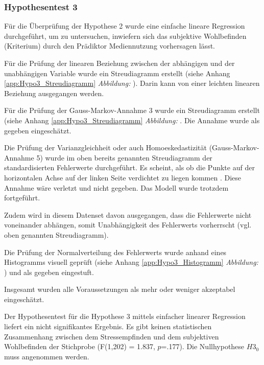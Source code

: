 \subsubsection{Hypothesentest 3}
Für die Überprüfung der Hypothese 2 wurde eine einfache lineare Regression durchgeführt, um zu untersuchen, inwiefern sich das subjektive Wohlbefinden (Kriterium) durch den Prädiktor Mediennutzung vorhersagen lässt.


Für die Prüfung der linearen Beziehung zwischen der abhängigen und der unabhängigen Variable wurde ein Streudiagramm erstellt (siehe Anhang \ref{app:Hypo3_Streudiagramm}  \textit{Abbildung: }). Darin kann von einer leichten linearen Beziehung ausgegangen werden.

Für die Prüfung der Gauss-Markov-Annahme 3 \cite{UniversitatZurich2018} wurde ein Streudiagramm erstellt (siehe Anhang \ref{app:Hypo3_Streudiagramm} \textit{Abbildung: }. Die Annahme wurde als gegeben eingeschätzt. 

Die Prüfung der Varianzgleichheit oder auch Homoeskedastizität (Gauss-Markov-Annahme 5) wurde im oben bereits genannten Streudiagramm der standardisierten Fehlerwerte durchgeführt. Es scheint, als ob die Punkte auf der horizontalen Achse auf der linken Seite verdichtet zu liegen kommen \cite{Hemmerich2018}. Diese Annahme wäre verletzt und nicht gegeben. Das Modell wurde trotzdem fortgeführt.

Zudem wird in diesem Datenset davon ausgegangen, dass die Fehlerwerte nicht voneinander abhängen, somit Unabhängigkeit des Fehlerwerts vorherrscht (vgl. oben genannten Streudiagramm).

Die Prüfung der Normalverteilung des Fehlerwerts wurde anhand eines Histogramms visuell geprüft (siehe Anhang \ref{app:Hypo3_Histogramm} \textit{Abbildung: }) und als gegeben eingestuft.

Insgesamt wurden alle Voraussetzungen als mehr oder weniger akzeptabel eingeschätzt.

Der Hypothesentest für die Hypothese 3 mittels einfacher linearer Regression liefert ein nicht signifikantes Ergebnis. Es gibt keinen statistischen Zusammenhang zwischen dem Stressempfinden und dem subjektiven Wohlbefinden der Stichprobe (F(1,202) = 1.837, $p$=.177).  Die Nullhypothese $H3_{0}$ muss angenommen werden.

